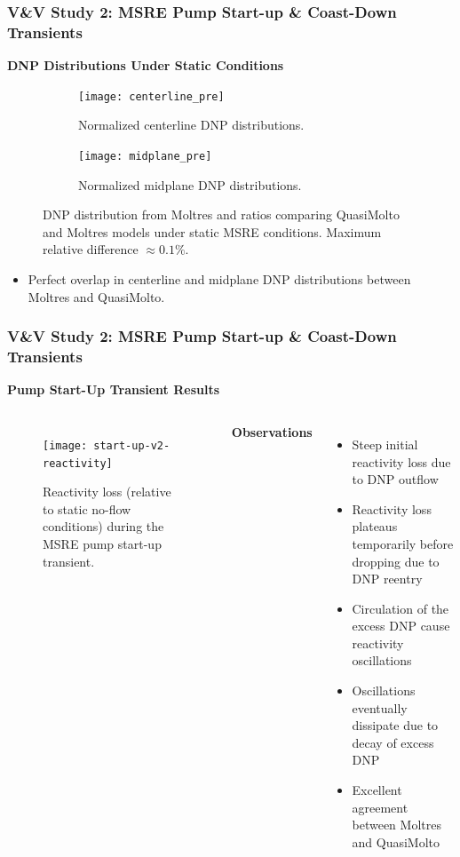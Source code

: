 \begin{frame}
  \frametitle{V\&V Study 2: MSRE Pump Start-up \& Coast-Down Transients}
  \textbf{DNP Distributions Under Static Conditions}
  \begin{figure}[t]
    \centering
    \begin{subfigure}[b]{0.48\columnwidth}
      \centering
      \texttt{[image: centerline\_pre]}
      \caption{Normalized centerline \gls{DNP} distributions.}
      \label{fig:centerline-pre-dist}
    \end{subfigure}
    \hfill
    \begin{subfigure}[b]{0.48\columnwidth}
      \centering
      \texttt{[image: midplane\_pre]}
      \caption{Normalized midplane \gls{DNP} distributions.}
      \label{fig:midplane-pre-dist}
    \end{subfigure}
    \caption{\gls{DNP} distribution from Moltres and ratios comparing QuasiMolto and
    Moltres models under static \gls{MSRE} conditions. Maximum relative difference $\approx 0.1 \%$.}
    \label{fig:centerline-pre}
  \end{figure}
  \begin{itemize}
    \item Perfect overlap in centerline and midplane DNP distributions between Moltres and QuasiMolto.
  \end{itemize}
\end{frame}

\begin{frame}
  \frametitle{V\&V Study 2: MSRE Pump Start-up \& Coast-Down Transients}
  \textbf{Pump Start-Up Transient Results}
  \begin{columns}
  \column{5.5cm}
  \begin{figure}[t]
    \centering
    \texttt{[image: start-up-v2-reactivity]}
    \caption{Reactivity loss (relative to static no-flow conditions) during the \gls{MSRE} pump
    start-up transient.}
    \label{fig:start-up-reactivity}
  \end{figure}
  \column{5.5cm}
  \textbf{Observations}
  \begin{itemize}
    \item Steep initial reactivity loss due to DNP outflow
    \item Reactivity loss plateaus temporarily before dropping due to DNP reentry
    \item Circulation of the excess DNP cause reactivity oscillations
    \item Oscillations eventually dissipate due to decay of excess DNP
    \item Excellent agreement between Moltres and QuasiMolto
  \end{itemize}
  \end{columns}
\end{frame}

